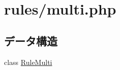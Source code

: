 \hypertarget{multi_8php}{
\section{rules/multi.php}
\label{multi_8php}
}
\subsection*{データ構造}
\begin{DoxyCompactItemize}
\item 
class \hyperlink{class_rule_multi}{\-Rule\-Multi}
\end{DoxyCompactItemize}
